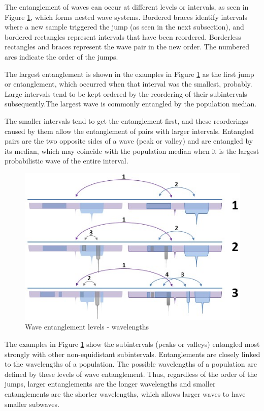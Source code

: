The entanglement of waves can occur at different levels or intervals, as seen in Figure \ref{fig:consciousness_subconscious_entanglement}, which forms nested wave systems. Bordered braces identify intervals where a new sample triggered the jump (as seen in the next subsection), and bordered rectangles represent intervals that have been reordered. Borderless rectangles and braces represent the wave pair in the new order. The numbered arcs indicate the order of the jumps.

The largest entanglement is shown in the examples in Figure \ref{fig:consciousness_subconscious_entanglement} as the first jump or entanglement, which occurred when that interval was the smallest, probably.  Large intervals tend to be kept ordered by the reordering of their subintervals subsequently.The largest wave is commonly entangled by the population median.

The smaller intervals tend to get the entanglement first, and these reorderings caused by them allow the entanglement of pairs with larger intervals. Entangled pairs are the two opposite sides of a wave (peak or valley) and are entangled by its median, which may coincide with the population median when it is the largest probabilistic wave of the entire interval.
	\begin{figure}[H]
	\caption{Wave entanglement levels - wavelengths}
	\label{fig:consciousness_subconscious_entanglement}
	\centering
	\includegraphics[scale=.8]{sections/images/consciousness_subconscious_entanglement.jpg}
	\end{figure}

The examples in Figure \ref{fig:consciousness_subconscious_entanglement} show the subintervals (peaks or valleys) entangled most strongly with other non-equidistant subintervals. Entanglements are closely linked to the wavelengths of a population. The possible wavelengths of a population are defined by these levels of wave entanglement. Thus, regardless of the order of the jumps, larger entanglements are the longer wavelengths and smaller entanglements are the shorter wavelengths, which allows larger waves to have smaller subwaves. 

